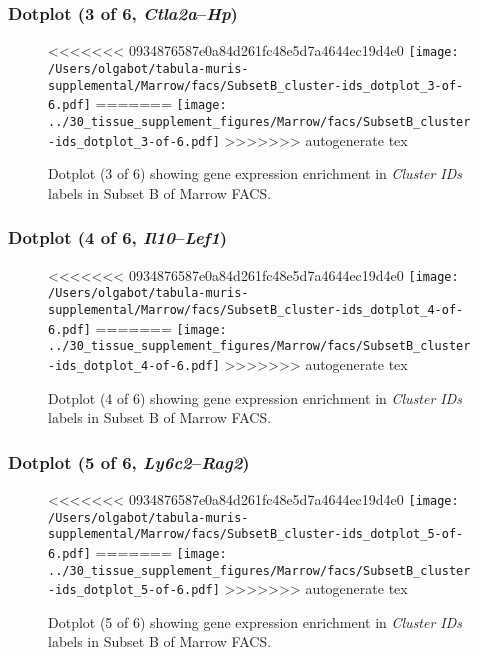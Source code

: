 \clearpage

\subsubsection{Dotplot (3 of 6, \emph{Ctla2a}--\emph{Hp})}
\begin{figure}[h]
\centering
<<<<<<< 0934876587e0a84d261fc48e5d7a4644ec19d4e0
\texttt{[image: /Users/olgabot/tabula-muris-supplemental/Marrow/facs/SubsetB\_cluster-ids\_dotplot\_3-of-6.pdf]}
=======
\texttt{[image: ../30\_tissue\_supplement\_figures/Marrow/facs/SubsetB\_cluster-ids\_dotplot\_3-of-6.pdf]}
>>>>>>> autogenerate tex

\caption{ Dotplot (3 of 6)  showing gene expression enrichment in \emph{Cluster IDs} labels in Subset B of Marrow FACS. }
\end{figure}


\clearpage

\subsubsection{Dotplot (4 of 6, \emph{Il10}--\emph{Lef1})}
\begin{figure}[h]
\centering
<<<<<<< 0934876587e0a84d261fc48e5d7a4644ec19d4e0
\texttt{[image: /Users/olgabot/tabula-muris-supplemental/Marrow/facs/SubsetB\_cluster-ids\_dotplot\_4-of-6.pdf]}
=======
\texttt{[image: ../30\_tissue\_supplement\_figures/Marrow/facs/SubsetB\_cluster-ids\_dotplot\_4-of-6.pdf]}
>>>>>>> autogenerate tex

\caption{ Dotplot (4 of 6)  showing gene expression enrichment in \emph{Cluster IDs} labels in Subset B of Marrow FACS. }
\end{figure}


\clearpage

\subsubsection{Dotplot (5 of 6, \emph{Ly6c2}--\emph{Rag2})}
\begin{figure}[h]
\centering
<<<<<<< 0934876587e0a84d261fc48e5d7a4644ec19d4e0
\texttt{[image: /Users/olgabot/tabula-muris-supplemental/Marrow/facs/SubsetB\_cluster-ids\_dotplot\_5-of-6.pdf]}
=======
\texttt{[image: ../30\_tissue\_supplement\_figures/Marrow/facs/SubsetB\_cluster-ids\_dotplot\_5-of-6.pdf]}
>>>>>>> autogenerate tex

\caption{ Dotplot (5 of 6)  showing gene expression enrichment in \emph{Cluster IDs} labels in Subset B of Marrow FACS. }
\end{figure}


